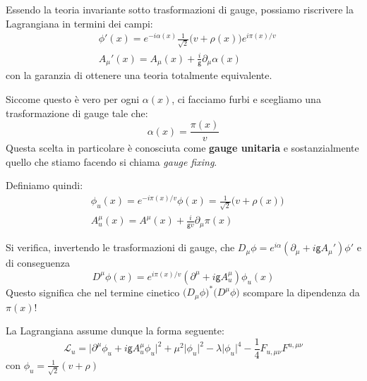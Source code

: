 \documentclass[../main.tex]{subfiles}
\begin{document}
Essendo la teoria invariante sotto trasformazioni di gauge, possiamo riscrivere la Lagrangiana in termini dei campi:
\[
\begin{aligned}
    &\phi'(x)=e^{-i\alpha(x)}\frac{1}{\sqrt{2}} \big(v+\rho(x)\big)e^{i\pi(x)/v} \\
    &A_\mu'(x)= A_\mu(x) + \frac{i}{\mathsf g}\partial_\mu\alpha(x)
\end{aligned}
\]
con la garanzia di ottenere una teoria totalmente equivalente.

Siccome questo è vero per ogni $\alpha(x)$, ci facciamo furbi e scegliamo una trasformazione di gauge tale che:
\begin{equation}
    \boxed{\alpha(x) = \frac{\pi(x)}{v}}
    \label{eq:unitary_gauge}
\end{equation}
Questa scelta in particolare è conosciuta come \textbf{gauge unitaria} e sostanzialmente quello che stiamo facendo si chiama \textit{gauge fixing}.

Definiamo quindi:
\begin{equation}
    \boxed{\begin{aligned}
        &\phi_u(x)=e^{-i\pi(x)/v}\phi(x) = \frac{1}{\sqrt{2}} \big(v+\rho(x)\big) \\
        &A^\mu_u(x)= A^\mu(x) + \frac{i}{\mathsf gv}\partial_\mu\pi(x)
    \end{aligned}}
    \label{eq:unitary_gauged_fields}
\end{equation}

Si verifica, invertendo le trasformazioni di gauge, che $D_\mu\phi = e^{i\alpha}(\partial_\mu +i\mathsf gA_\mu')\phi'$ e di conseguenza
\[
D^\mu\phi(x) = e^{i\pi(x)/v}(\partial^\mu +i\mathsf gA^\mu_u)\phi_u(x)
\]
Questo significa che nel termine cinetico $\big(D_\mu\phi\big)^\ast\big(D^\mu\phi\big)$ scompare la dipendenza da $\pi(x)$!

La Lagrangiana assume dunque la forma seguente:
\begin{equation}
    \boxed{\mathscr{L}_u = \Big|\partial^\mu\phi_u +i\mathsf gA^\mu_u\phi_u\Big|^2 +\mu^2\big|\phi_u\big|^2 - \lambda \big|\phi_u\big|^4 - \frac{1}{4}F_{u,\mu\nu}F^{u,\mu\nu}}
    \label{eq:unitary_gauged_lagrangian}
\end{equation}
con $\phi_u = \frac{1}{\sqrt2}(v+\rho)$
\end{document}
